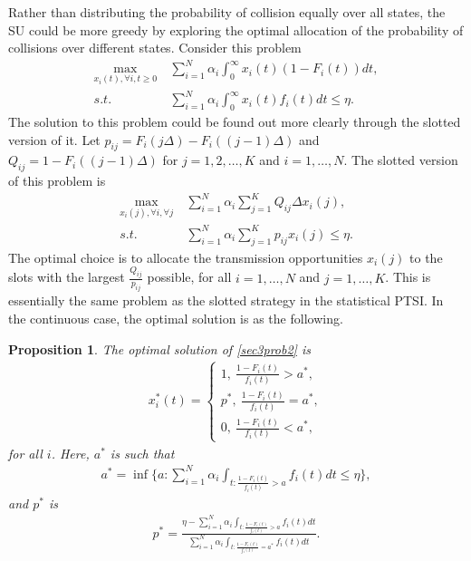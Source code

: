 \documentclass[10pt,final,journal,letterpaper]{IEEEtran}
\newtheorem{proposition}{Proposition}
\begin{document}
\par
Rather than distributing the probability of collision equally over all states, the SU could be more greedy by exploring the optimal allocation of the probability of collisions over different states. Consider this problem
\begin{align}\label{sec3prob2}
    \max\limits_{x_i(t),\forall i,t\geq 0}&\ \sum_{i=1}^N\alpha_i\int_0^{\infty}x_i(t)(1-F_i(t))dt,\nonumber\\
    s.t.&\ \sum_{i=1}^N\alpha_i\int_0^{\infty}x_i(t)f_i(t)dt\leq\eta.
\end{align}
The solution to this problem could be found out more clearly through the slotted version of it. Let $p_{ij}=F_i(j\Delta)-F_i((j-1)\Delta)$ and $Q_{ij}=1-F_i((j-1)\Delta)$ for $j=1,2,\ldots,K$ and $i=1,\ldots, N$. The slotted version of this problem is
\begin{align}
    \max\limits_{x_i(j),\forall i, \forall j}&\ \sum_{i=1}^N\alpha_i\sum_{j=1}^{K}Q_{ij}\Delta x_i(j),\nonumber\\
    s.t.&\ \sum_{i=1}^N\alpha_i\sum_{j=1}^{K}p_{ij}x_i(j)\leq\eta.\nonumber
\end{align}
The optimal choice is to allocate the transmission opportunities $x_i(j)$ to the slots with the largest $\frac{Q_{ij}}{p_{ij}}$ possible, for all $i=1,\ldots,N$ and $j=1,\ldots,K$. This is essentially the same problem as the slotted strategy in the statistical PTSI. In the continuous case, the optimal solution is as the following.
\begin{proposition}\label{sec3prop1}
The optimal solution of \eqref{sec3prob2} is
\begin{align}\label{sec3markovopt}
    x_i^{\ast}(t)=
    \begin{cases}
    1,\ \frac{1-F_i(t)}{f_i(t)}>a^{\ast},\\
    p^{\ast},\ \frac{1-F_i(t)}{f_i(t)}=a^{\ast},\\
    0,\ \frac{1-F_i(t)}{f_i(t)}<a^{\ast},
    \end{cases}
\end{align}
for all $i$. Here, $a^{\ast}$ is such that
\begin{align}
    a^{\ast}=\inf\Big\{a:\sum_{i=1}^N\alpha_i\int_{t:\frac{1-F_i(t)}{f_i(t)}>a}f_i(t)dt\leq\eta\Big\},\nonumber
\end{align}
and $p^{\ast}$ is
\begin{align}
    p^{\ast}=\frac{\eta-\sum_{i=1}^N\alpha_i\int_{t:\frac{1-F_i(t)}{f_i(t)}>a}f_i(t)dt}{\sum_{i=1}^N\alpha_i\int_{t:\frac{1-F_i(t)}{f_i(t)}=a^{\ast}}f_i(t)dt}.\nonumber
\end{align}
\end{proposition}
\end{document}
